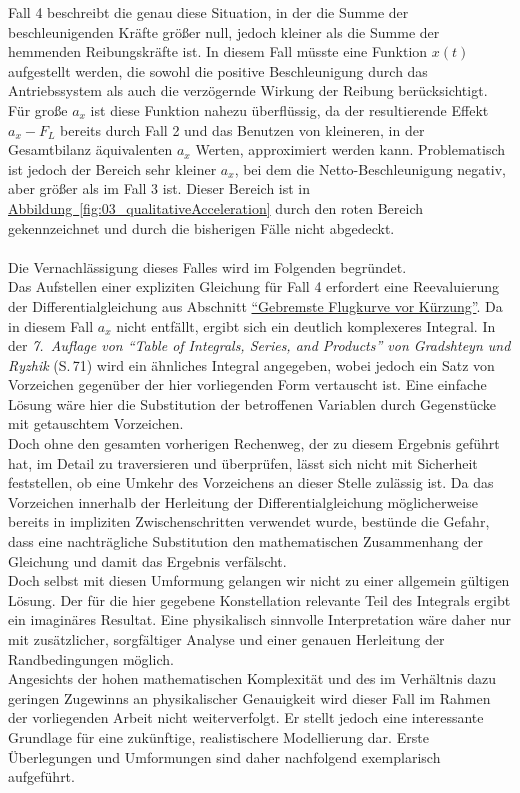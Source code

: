 Fall 4 beschreibt die genau diese Situation, in der die Summe der beschleunigenden Kräfte größer null, jedoch kleiner als die Summe der hemmenden Reibungskräfte ist. In diesem Fall müsste eine Funktion $x(t)$ aufgestellt werden, die sowohl die positive Beschleunigung durch das Antriebssystem als auch die verzögernde Wirkung der Reibung berücksichtigt. Für große $a_x$ ist diese Funktion nahezu überflüssig, da der resultierende Effekt $a_x - F_L$ bereits durch Fall 2 und das Benutzen von kleineren, in der Gesamtbilanz äquivalenten $a_x$ Werten, approximiert werden kann. Problematisch ist jedoch der Bereich sehr kleiner $a_x$, bei dem die Netto-Beschleunigung negativ, aber größer als im Fall 3 ist. Dieser Bereich ist in \hyperref[fig:03_qualitativeAcceleration]{Abbildung~\ref*{fig:03_qualitativeAcceleration}} durch den roten Bereich gekennzeichnet und durch die bisherigen Fälle nicht abgedeckt.
\\
\\
Die Vernachlässigung dieses Falles wird im Folgenden begründet.
\\
Das Aufstellen einer expliziten Gleichung für Fall 4 erfordert eine Reevaluierung der Differentialgleichung aus Abschnitt \hyperref[sec:fall_vier_ax]{\enquote{Gebremste Flugkurve vor Kürzung}}. Da in diesem Fall $a_x$ nicht entfällt, ergibt sich ein deutlich komplexeres Integral. In der \textit{7.\ Auflage von \enquote{Table of Integrals, Series, and Products} von Gradshteyn und Ryzhik}\parencite{toi_p71} (S.\,71) wird ein ähnliches Integral angegeben, wobei jedoch ein Satz von Vorzeichen gegenüber der hier vorliegenden Form vertauscht ist. Eine einfache Lösung wäre hier die Substitution der betroffenen Variablen durch Gegenstücke mit getauschtem Vorzeichen.\\
Doch ohne den gesamten vorherigen Rechenweg, der zu diesem Ergebnis geführt hat, im Detail zu traversieren und überprüfen, lässt sich nicht mit Sicherheit feststellen, ob eine Umkehr des Vorzeichens an dieser Stelle zulässig ist. Da das Vorzeichen innerhalb der Herleitung der Differentialgleichung möglicherweise bereits in impliziten Zwischenschritten verwendet wurde, bestünde die Gefahr, dass eine nachträgliche Substitution den mathematischen Zusammenhang der Gleichung und damit das Ergebnis verfälscht.
\\
Doch selbst mit diesen Umformung gelangen wir nicht zu einer allgemein gültigen Lösung. Der für die hier gegebene Konstellation relevante Teil des Integrals ergibt ein imaginäres Resultat. Eine physikalisch sinnvolle Interpretation wäre daher nur mit zusätzlicher, sorgfältiger Analyse und einer genauen Herleitung der Randbedingungen möglich.  
\\
Angesichts der hohen mathematischen Komplexität und des im Verhältnis dazu geringen Zugewinns an physikalischer Genauigkeit wird dieser Fall im Rahmen der vorliegenden Arbeit nicht weiterverfolgt. Er stellt jedoch eine interessante Grundlage für eine zukünftige, realistischere Modellierung dar. Erste Überlegungen und Umformungen sind daher nachfolgend exemplarisch aufgeführt.




